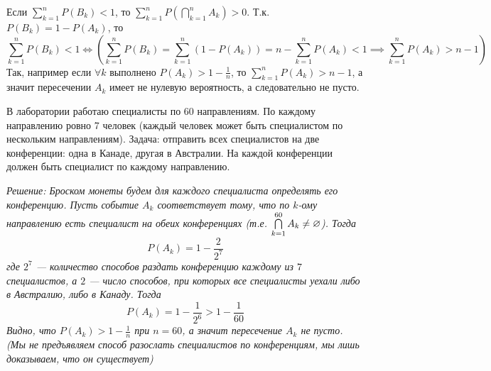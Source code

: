 Если $\sum\limits_{k = 1}^{n} P(B_k) < 1$, то $\sum\limits_{k = 1}^{n} P\left( \bigcap\limits_{k = 1}^n A_k \right) > 0$.
Т.к. $P(B_k) = 1 - P(A_k)$, то
\[
    \sum\limits_{k = 1}^{n} P(B_k) < 1 \iff
    \left(\sum\limits_{k = 1}^{n} P(B_k) =
    \sum\limits_{k = 1}^{n} \left( 1 - P(A_k) \right) =
    n - \sum\limits_{k = 1}^{n} P(A_k) < 1
    \implies
    \sum\limits_{k = 1}^n P(A_k) > n - 1
    \right)
\]
Так, например если $\forall k$ выполнено $P(A_k) > 1 - \frac{1}{n}$, то $\sum\limits_{k = 1}^n P(A_k) > n - 1$, а значит
пересечении $A_k$ имеет не нулевую вероятность, а следовательно не пусто.
\begin{comment}
    \[
        P(\nothing) = 1 - P(\Omega) = 1 - 1 = 0
    \]
    С другой стороны
    \[
        P(\nothing) = \frac{|\nothing|}{|\Omega|} = \frac{0}{|\Omega|} = 0
    \]
\end{comment}
\begin{problem}
    В лаборатории работаю специалисты по 60 направлениям. По каждому направлению ровно 7 человек (каждый человек может быть
    специалистом по нескольким направлениям). Задача: отправить всех специалистов на две конференции: одна в Канаде,
    другая в Австралии. На каждой конференции должен быть специалист по каждому направлению.

    \it{Решение:} Броском монеты будем для каждого специалиста определять его конференцию. Пусть событие $A_k$ соответствует
    тому, что по $k$-ому направлению есть специалист на обеих конференциях (т.е. $\bigcap\limits_{k = 1}^{60} A_k \neq \varnothing$).
    Тогда
    \[
        P(A_k) = 1 - \frac{2}{2^7}
    \]
    где $2^7$ --- количество способов раздать конференцию каждому из $7$ специалистов, а $2$ --- число способов, при которых
    все специалисты уехали либо в Австралию, либо в Канаду. Тогда
    \[
        P(A_k) = 1 - \frac{1}{2^6} > 1 - \frac{1}{60}
    \]
    Видно, что $P(A_k) > 1 - \frac{1}{n}$ при $n = 60$, а значит пересечение $A_k$ не пусто.
    (Мы не предъявляем способ разослать специалистов по конференциям, мы лишь доказываем, что он существует)
\end{problem}

